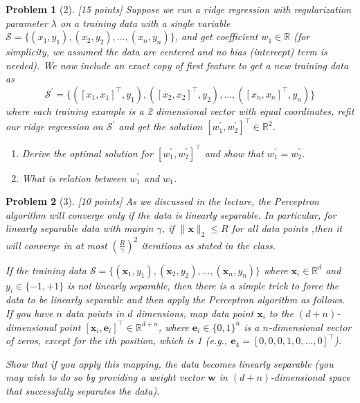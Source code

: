 \documentclass[11pt]{article}
\theoremstyle{quest}
\newtheorem*{problem}{Problem}
\begin{document}
\begin{problem}[2]
[15 points] Suppose we run a ridge regression with regularization parameter $\lambda$ on a training data with a single variable $\mathcal{S} = \{(x_{1}, y_1),(x_{2}, y_2),\dots,(x_{n}, y_n)\}$, and get coefficient $w_1 \in \mathbb{R}$ (for simplicity, we assumed the data are centered and no bias (intercept) term is needed).
We now include an exact copy of first feature to get a new training data as
\begin{equation*}
    \mathcal{S}^{\prime} = \{([x_{1}, x_{1}]^{\top}, y_1),([x_{2}, x_{2}]^{\top}, y_2),\dots,([x_{n}, x_{n}]^{\top}, y_n)\}   
\end{equation*}
where each training example is a 2 dimensional vector with equal coordinates, refit our ridge regression on $\mathcal{S}^{\prime}$ and get the solution $[w_1^{\prime}, w_2^{\prime}]^{\top} \in \mathbb{R}^{2}$.
\begin{enumerate}
    \item Derive the optimal solution for $[w_1^{\prime}, w_2^{\prime}]^{\top}$ and show that $w_1^{\prime} = w_2^{\prime}$.
    \item What is relation between $w_1^{\prime}$ and $w_1$.
\end{enumerate}
\end{problem}

\begin{problem}[3]
[10 points] As we discussed in the lecture, the Perceptron algorithm will converge only if the data is linearly separable. In particular, for linearly separable data with margin $\gamma$, if $\lVert\bm{x}\rVert_2 \leq R$ for all data points ,then it will converge in at most $\left(\frac{R}{\gamma}\right)^2$ iterations as stated in the class.

If the training data $\mathcal{S} = \{(\bm{x}_{1}, y_1),(\bm{x}_{2}, y_2),\dots,(\bm{x}_{n}, y_n)\}$ where $\bm{x}_{i} \in \mathbb{R}^{d} $ and $y_i \in \{-1, +1\}$ is not linearly separable, then there is a simple trick to force the data to be linearly separable and then apply the Perceptron algorithm as follows. If you have $n$ data points in $d$ dimensions, map data point $\bm{x}_{i}$ to the $(d+n)$-dimensional point $[\bm{x}_{i}, \bm{e}_{i}]^{\top} \in \mathbb{R}^{d+n}$, where $\bm{e}_{i} \in \{0,1\}^n$ is a $n$-dimensional vector of zeros, except for the $i$th position, which is 1 (e.g., $\bm{e}_{4}=[0,0,0,1,0,\dots,0]^{\top}$).

Show that if you apply this mapping, the data becomes linearly separable (you may wish to do so by providing a weight vector $\bm{w}$ in $(d+n)$-dimensional space that successfully separates the data).
\end{problem}
\end{document}
